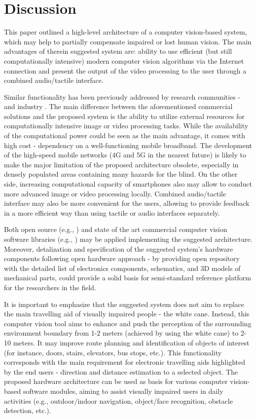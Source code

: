 \documentclass[10pt,conference,compsocconf]{IEEEtran}
\begin{document}
 
\section{Discussion}
\label{sec:discussion}


This paper outlined a high-level architecture of a computer vision-based system, which may help to partially compensate impaired or lost human vision. The main advantages of therein suggested system are: ability to use efficient (but still computationally intensive) modern computer vision algorithms via the Internet connection and present the output of the video processing to the user through a combined audio/tactile interface. 

Similar functionality has been previously addressed by research communities \cite{Caraiman}-\cite{Zientara} and industry \cite{orcam}\cite{horus}. The main difference between the aforementioned commercial solutions and the proposed system is the ability to utilize external resources for computationally intensive image or video processing tasks. While the availability of the computational power could be seen as the main advantage, it comes with high cost - dependency on a well-functioning mobile broadband. The development of the high-speed mobile networks (4G and 5G in the nearest future) is likely to make the major limitation of the proposed architecture obsolete, especially in densely populated areas containing many hazards for the blind. On the other side, increasing computational capacity of smartphones also may allow to conduct more advanced image or video processing locally. Combined audio/tactile interface may also be more convenient for the users, allowing to provide feedback in a more efficient way than using tactile or audio interfaces separately. 

Both open source (e.g., \cite{Tensorflow}) and state of the art commercial computer vision software libraries (e.g., \cite{Verilook}) may be applied implementing the suggested architecture. Moreover, detalization and specification of the suggested system's hardware components following open hardware approach - by providing open repository with the detailed list of electronics components, schematics, and 3D models of mechanical parts, could provide a solid basis for semi-standard reference platform for the researchers in the field.


It is important to emphasize that the suggested system does not aim to replace the main travelling aid of visually impaired people - the white cane. Instead, this computer vision tool aims to enhance and push the perception of the surrounding environment boundary from 1-2 meters (achieved by using the white cane) to 2-10 meters. It may improve route planning and identification of objects of interest (for instance, doors, stairs, elevators, bus stops, etc.). This functionality corresponds with the main requirement for electronic travelling aids highlighted by the end users - direction and distance estimation to a selected object. The proposed hardware architecture can be used as basis for various computer vision-based software modules, aiming to assist visually impaired users in daily activities (e.g., outdoor/indoor navigation, object/face recognition, obstacle detection, etc.). 
\end{document}

